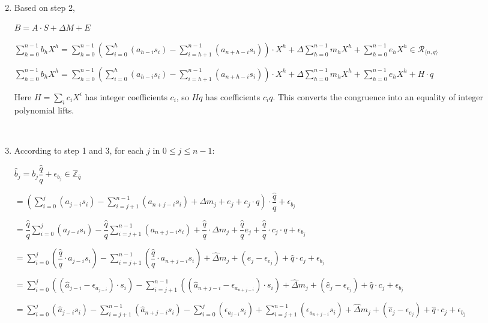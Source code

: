 \begin{enumerate}
$ $




\item Based on step 2,

$B = A \cdot S + \Delta  M + E$ 


$\sum\limits_{h=0}^{n-1}  b_h  X^{h}  = \sum\limits_{h=0}^{n-1}  \left(\sum\limits_{i=0}^{h}(a_{h-i}s_{i}) - \sum\limits_{i=h+1}^{n-1}(a_{n+h-i}s_{i}) \right)\cdot X^{h}  + \Delta \sum\limits_{h=0}^{n-1}  m_h  X^{h} + \sum\limits_{h=0}^{n-1}  e_h  X^{h}  \in \mathcal{R}_{\langle n,q\rangle}$

$\sum\limits_{h=0}^{n-1}  b_h  X^{h}  = \sum\limits_{h=0}^{n-1}  \left(\sum\limits_{i=0}^{h}(a_{h-i}s_{i}) - \sum\limits_{i=h+1}^{n-1}(a_{n+h-i}s_{i}) \right)\cdot X^{h}  + \Delta \sum\limits_{h=0}^{n-1}  m_h  X^{h} + \sum\limits_{h=0}^{n-1}  e_h  X^{h} + H \cdot q$

Here $H=\sum_i c_iX^i$ has integer coefficients $c_i$, so $Hq$ has coefficients $c_iq$. This converts the congruence into an equality of integer polynomial lifts.

$ $

\item According to step 1 and 3, for each $j$ in $0 \leq j \leq n-1$:

$\hat{b}_j = b_j\dfrac{\hat{q}}{q} + \epsilon_{b_j} \in \mathbb{Z}_{\hat{q}}$

$= \left(\sum\limits_{i=0}^{j}(a_{j-i}s_{i}) - \sum\limits_{i=j+1}^{n-1}(a_{n+j-i}s_{i}) + \Delta m_j + e_j + c_j \cdot q\right) \cdot \dfrac{\hat{q}}{q} + \epsilon_{b_j}$

$= \dfrac{\hat{q}}{q} \sum\limits_{i=0}^{j}(a_{j-i}s_{i}) - \dfrac{\hat{q}}{q} \sum\limits_{i=j+1}^{n-1}(a_{n+j-i}s_{i}) + \dfrac{\hat{q}}{q} \cdot \Delta m_j + \dfrac{\hat{q}}{q} e_j + \dfrac{\hat{q}}{q} \cdot c_j \cdot q + \epsilon_{b_j}$

$=  \sum\limits_{i=0}^{j}\left(\dfrac{\hat{q}}{q}\cdot a_{j-i}s_{i}\right) - \sum\limits_{i=j+1}^{n-1}\left(\dfrac{\hat{q}}{q} \cdot a_{n+j-i}s_{i}\right) + \hat{\Delta} m_j + (\hat{e}_j - \epsilon_{e_j}) + \hat{q} \cdot c_j + \epsilon_{b_j}$

$=  \sum\limits_{i=0}^{j}((\hat{a}_{j-i}-\epsilon_{a_{j-i}})\cdot s_{i}) - \sum\limits_{i=j+1}^{n-1}((\hat{a}_{n+j-i}-\epsilon_{a_{n+j-i}})\cdot s_{i}) + \hat{\Delta} m_j + (\hat{e}_j - \epsilon_{e_j}) + \hat{q} \cdot c_j + \epsilon_{b_j}$

$=  \sum\limits_{i=0}^{j}(\hat{a}_{j-i}s_i) 
- \sum\limits_{i=j+1}^{n-1}(\hat{a}_{n+j-i}s_i)
- \sum\limits_{i=0}^{j}(\epsilon_{a_{j-i}} s_i)
+ \sum\limits_{i=j+1}^{n-1}(\epsilon_{a_{n+j-i}} s_i)
+ \hat{\Delta} m_j + (\hat{e}_j - \epsilon_{e_j}) + \hat{q} \cdot c_j + \epsilon_{b_j}$



\end{enumerate}
